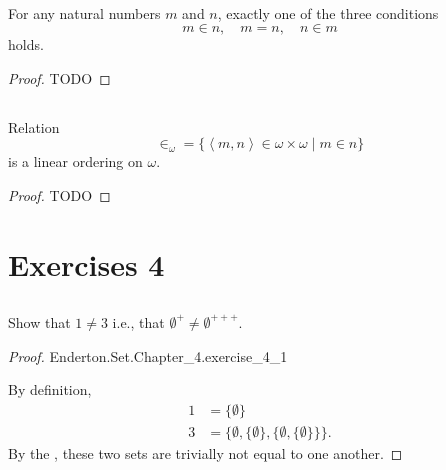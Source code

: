 \documentclass{report}
\newcommand{\pair}[1]{\left< #1 \right>}
\begin{document}
\subsection{}%

\begin{theorem}

  For any natural numbers $m$ and $n$, exactly one of the three conditions
    $$m \in n, \quad m = n, \quad n \in m$$ holds.

\end{theorem}

\begin{proof}

  TODO

\end{proof}

\subsection{}%

\begin{theorem}

  Relation
    $$\in_\omega = \{\pair{m, n} \in \omega \times \omega \mid m \in n\}$$
    is a linear ordering on $\omega$.

\end{theorem}

\begin{proof}

  TODO

\end{proof}

\section{Exercises 4}%

\subsection{}%

Show that $1 \neq 3$ i.e., that $\emptyset^+ \neq \emptyset^{+++}$.

\begin{proof}

    {Enderton.Set.Chapter\_4.exercise\_4\_1}

  By definition,
    \begin{align*}
      1 & = \{\emptyset\} \\
      3 & = \{\emptyset, \{\emptyset\}, \{\emptyset, \{\emptyset\}\}\}.
    \end{align*}
  By the , these two sets are trivially not
    equal to one another.

\end{proof}
\end{document}
